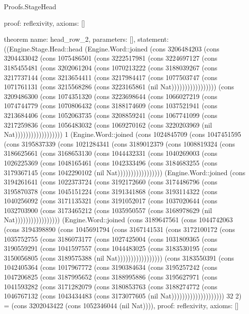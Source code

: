 \begin{lexlean}{Proofs.StageHead}
\begin{semanticmodule}
{  proof: reflexivity{},
  axioms: []
}

theorem{
  name: head_row_2,
  parameters: [],
  statement: ((Engine.Stage.Head::head (Engine.Word::joined (cons 3206484203 (cons 3204433042 (cons 1075486501 (cons 3222517981 (cons 3224697127 (cons 3185455481 (cons 3202061204 (cons 1070213222 (cons 3188039267 (cons 3217737144 (cons 3213654411 (cons 3217984417 (cons 1077503747 (cons 1071761131 (cons 3215568286 (cons 3223165861 (nil Nat))))))))))))))))) (cons 3209486300 (cons 1074351320 (cons 3223698644 (cons 1066027219 (cons 1074744779 (cons 1070806432 (cons 3188174609 (cons 1037521941 (cons 3213684406 (cons 1052063735 (cons 3208859241 (cons 1067741099 (cons 3217259836 (cons 1056483032 (cons 1069270162 (cons 3220203969 (nil Nat)))))))))))))))))) 1 (Engine.Word::joined (cons 1024845709 (cons 1047451595 (cons 3195837339 (cons 1021284341 (cons 3189012379 (cons 1008819324 (cons 3186625661 (cons 3168653130 (cons 1044432331 (cons 1040269003 (cons 1026225369 (cons 1048165461 (cons 1042333496 (cons 3184683255 (cons 3179367145 (cons 1042290102 (nil Nat))))))))))))))))) (Engine.Word::joined (cons 3194261641 (cons 1022373724 (cons 3192172660 (cons 3174486796 (cons 3195870378 (cons 1045151224 (cons 3191341868 (cons 3193114322 (cons 1040256092 (cons 3171135321 (cons 3191052017 (cons 1037020644 (cons 1032703900 (cons 3173465212 (cons 1035950557 (cons 3168978629 (nil Nat))))))))))))))))) (Engine.Word::joined (cons 3189647561 (cons 1044742063 (cons 3194398890 (cons 1045691794 (cons 3167141531 (cons 3172100172 (cons 1035752755 (cons 3186073177 (cons 1027425004 (cons 1031809365 (cons 3190559291 (cons 1041597557 (cons 1044483025 (cons 3183530195 (cons 3150056805 (cons 3189575388 (nil Nat))))))))))))))))) (cons 3183550391 (cons 1042405364 (cons 1017967772 (cons 3190384634 (cons 3195257242 (cons 1047206825 (cons 3187995652 (cons 3188995886 (cons 3195627971 (cons 1041593282 (cons 3171282079 (cons 3180853763 (cons 3188274772 (cons 1046767132 (cons 1043434483 (cons 3173077605 (nil Nat)))))))))))))))))))) 32 2) = (cons 3202043422 (cons 1052346044 (nil Nat)))),
  proof: reflexivity{},
  axioms: []
}
\end{semanticmodule}
\end{lexlean}
